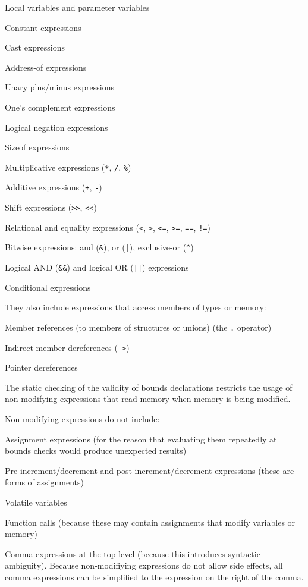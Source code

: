 \begin{compactitem}
\item
  Local variables and parameter variables
\item
  Constant expressions
\item
  Cast expressions
\item
  Address-of expressions
\item
  Unary plus/minus expressions
\item
  One's complement expressions
\item
  Logical negation expressions
\item
  Sizeof expressions
\item
  Multiplicative expressions (\texttt{*}, \texttt{/}, \texttt{\%})
\item
  Additive expressions (\texttt{+}, \texttt{-})
\item
  Shift expressions (\texttt{>>}, \texttt{<<})
\item
  Relational and equality expressions (\texttt{<}, \texttt{>},
  \texttt{<=}, \texttt{>=}, \texttt{==}, \texttt{!=})
\item
  Bitwise expressions: and (\texttt{\&}), or (\texttt{|}), exclusive-or (\texttt{\^})
\item
  Logical AND (\texttt{\&\&}) and logical OR (\texttt{||}) expressions
\item
  Conditional expressions
\end{compactitem}

They also include expressions that access members of types or memory:

\begin{compactitem}
\item
  Member references (to members of structures or unions) (the \texttt{.}
  operator)
\item
  Indirect member dereferences (\texttt{->})
\item
  Pointer dereferences
\end{compactitem}

The static checking of the validity of bounds declarations restricts the
usage of non-modifying expressions that read memory when memory is being
modified.

Non-modifying expressions do not include:

\begin{compactitem}
\item
  Assignment expressions (for the reason that evaluating them repeatedly
  at bounds checks would produce unexpected results)
\item
  Pre-increment/decrement and post-increment/decrement expressions
  (these are forms of assignments)
\item
  Volatile variables
\item
  Function calls (because these may contain assignments that modify
  variables or memory)
\item
  Comma expressions at the top level (because this introduces syntactic
  ambiguity). Because non-modifiying expressions do not allow side effects,
  all comma expressions can be simplified to the expression on
  the right of the comma.
\end{compactitem}

